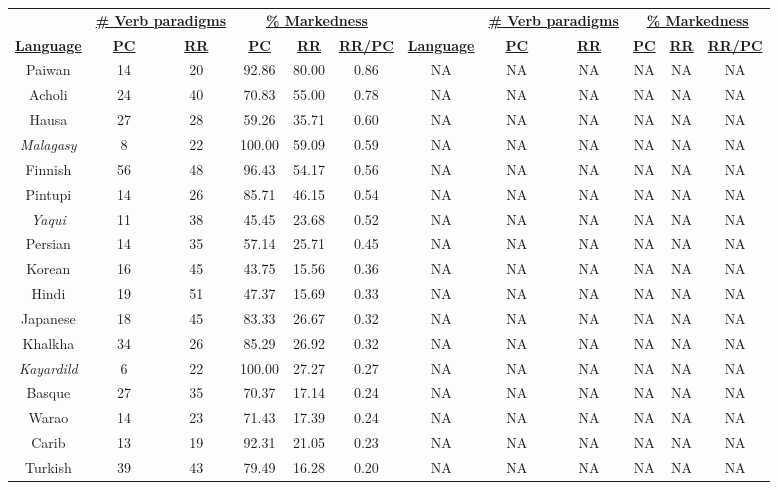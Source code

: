 \begin{tabular}{cccccccccccc}
 & \multicolumn{2}{c}{\underline{\textbf{\# Verb paradigms}}} & \multicolumn{3}{c}{\underline{\textbf{\% Markedness}}} & & \multicolumn{2}{c}{\underline{\textbf{\# Verb paradigms}}} & \multicolumn{3}{c}{\underline{\textbf{\% Markedness}}} \\
\underline{\textbf{Language}} & \underline{\textbf{PC}} & \underline{\textbf{RR}} & \underline{\textbf{PC}} & \underline{\textbf{RR}} & \underline{\textbf{RR/PC}} & \underline{\textbf{Language}} & \underline{\textbf{PC}} & \underline{\textbf{RR}} & \underline{\textbf{PC}} & \underline{\textbf{RR}} & \underline{\textbf{RR/PC}} \\
Paiwan & 14 & 20 & 92.86 & 80.00 & 0.86 & NA & NA & NA & NA & NA & NA \\
Acholi & 24 & 40 & 70.83 & 55.00 & 0.78 & NA & NA & NA & NA & NA & NA \\
Hausa & 27 & 28 & 59.26 & 35.71 & 0.60 & NA & NA & NA & NA & NA & NA \\
\emph{Malagasy} & 8 & 22 & 100.00 & 59.09 & 0.59 & NA & NA & NA & NA & NA & NA \\
Finnish & 56 & 48 & 96.43 & 54.17 & 0.56 & NA & NA & NA & NA & NA & NA \\
Pintupi & 14 & 26 & 85.71 & 46.15 & 0.54 & NA & NA & NA & NA & NA & NA \\
\emph{Yaqui} & 11 & 38 & 45.45 & 23.68 & 0.52 & NA & NA & NA & NA & NA & NA \\
Persian & 14 & 35 & 57.14 & 25.71 & 0.45 & NA & NA & NA & NA & NA & NA \\
Korean & 16 & 45 & 43.75 & 15.56 & 0.36 & NA & NA & NA & NA & NA & NA \\
Hindi & 19 & 51 & 47.37 & 15.69 & 0.33 & NA & NA & NA & NA & NA & NA \\
Japanese & 18 & 45 & 83.33 & 26.67 & 0.32 & NA & NA & NA & NA & NA & NA \\
Khalkha & 34 & 26 & 85.29 & 26.92 & 0.32 & NA & NA & NA & NA & NA & NA \\
\emph{Kayardild} & 6 & 22 & 100.00 & 27.27 & 0.27 & NA & NA & NA & NA & NA & NA \\
Basque & 27 & 35 & 70.37 & 17.14 & 0.24 & NA & NA & NA & NA & NA & NA \\
Warao & 14 & 23 & 71.43 & 17.39 & 0.24 & NA & NA & NA & NA & NA & NA \\
Carib & 13 & 19 & 92.31 & 21.05 & 0.23 & NA & NA & NA & NA & NA & NA \\
Turkish & 39 & 43 & 79.49 & 16.28 & 0.20 & NA & NA & NA & NA & NA & NA \\

\end{tabular}
